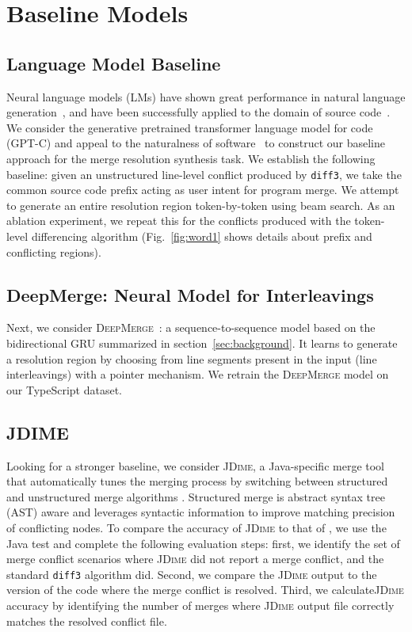 \section{Baseline Models}
\label{sec:baselines}

\subsection{Language Model Baseline}

Neural language models (LMs) have shown great performance in natural language generation~\citep{gpt2, sellam-etal-2020-bleurt}, and have been successfully applied to the domain of source code~\citep{10.5555/2337223.2337322, gptc, feng-etal-2020-codebert}. We consider the generative pretrained transformer language model for code (GPT-C) and appeal to the naturalness of software~\citep{naturalness} to construct our baseline approach for the merge resolution synthesis task. We establish the following baseline:
given an unstructured line-level conflict produced by \texttt{diff3}, we take the common source code prefix acting as user intent for program merge. We attempt to generate an entire resolution region token-by-token using beam search. As an ablation experiment, we repeat this for the conflicts produced with the token-level differencing algorithm (Fig.~\ref{fig:word1} shows details about prefix and conflicting regions).



\subsection{DeepMerge: Neural Model for Interleavings}

Next, we consider \textsc{DeepMerge}~\citep{Dinella2021}: a sequence-to-sequence model based on the bidirectional GRU summarized in section~\ref{sec:background}. It learns to generate a resolution region by choosing from line segments present in the input (line interleavings) with a pointer mechanism. We retrain the \textsc{DeepMerge} model on our TypeScript dataset.


\subsection{JDIME}
Looking for a stronger baseline, we consider \textsc{JDime}, a Java-specific merge tool that automatically tunes the merging process by switching between structured and unstructured merge algorithms \citep{apel2012structured}. Structured merge is abstract syntax tree (AST) aware and leverages syntactic information to improve matching precision of conflicting nodes. 
To compare the accuracy of \textsc{JDime} to that of \thistool{}, we use the Java test and complete the following evaluation steps: first, we identify the set of merge conflict scenarios where \textsc{JDime} did not report a merge conflict, and the standard \texttt{diff3} algorithm did. Second, we compare the \textsc{JDime} output to the version of the code where the merge conflict is resolved. Third, we calculate\textsc{JDime} accuracy by identifying the number of merges where \textsc{JDime} output file correctly matches the resolved conflict file.


